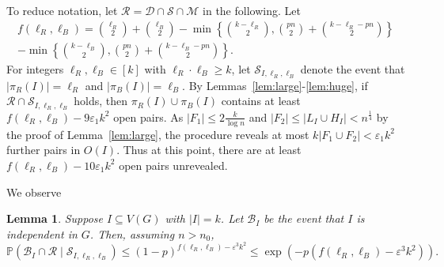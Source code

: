 \documentclass{article}
\newcommand{\p}{\mathbb{P}}
\newtheorem{lemma}[theorem]{Lemma}
\begin{document}
To reduce notation, let $\mathcal R=\mathcal D\cap\mathcal S\cap \mathcal M$ in the following.
Let 
\begin{multline*}
f(\ell_R, \ell_B) =  {\ell_R \choose 2} + {\ell_B \choose 2} -  \min\left\{ \binom{k-\ell_R}{2} , \binom{pn}{2}+\binom{k-\ell_R-pn}{2}\right\}\\
- \min\left\{ \binom{k-\ell_B}{2} , \binom{pn}{2}+\binom{k-\ell_B-pn}{2}\right\}.
\end{multline*}
For integers $\ell_R,\ell_B\in [k]$ with $\ell_R\cdot\ell_B\ge k$, let $\mathcal{S}_{I,\ell_R,\ell_B}$ denote the event that $|\pi_R(I)| = \ell_R$ and $|\pi_B(I)| = \ell_B.$  By Lemmas~\ref{lem:large}-\ref{lem:huge}, if $\mathcal{R} \cap \mathcal{S}_{I,\ell_R,\ell_B}$ holds, then $\pi_R(I)\cup \pi_B(I)$ contains at least $f(\ell_R,\ell_B)-9\varepsilon_1k^2$ 
open pairs. As $|F_1|\le 2\frac{k}{\log n}$ and $|F_2|\le |L_I\cup H_I|< n^{\frac14} $ by the proof of Lemma~\ref{lem:large}, the procedure reveals at most $k|F_1\cup F_2|<\varepsilon_1k^2$ further pairs in $O(I)$. Thus at this point, there are at least $f(\ell_R,\ell_B)-10\varepsilon_1k^2$ open pairs unrevealed.


We observe
\begin{lemma}\label{lem:RISI}
Suppose $I \subseteq V(G)$ 
with $|I| = k$.  Let $\mathcal{B}_I$ be the event that $I$ is independent in $G$.  Then, assuming $n>n_0$, %
\[
\p(\mathcal{B}_I \cap \mathcal R\mid   \mathcal{S}_{I, \ell_R, \ell_B}) \leq (1-p)^{f(\ell_R, \ell_B) - \varepsilon^3 k^2} \leq \exp(-p(f(\ell_R, \ell_B) - \varepsilon^3k^2)).  
\]
\end{lemma} 
\end{document}
